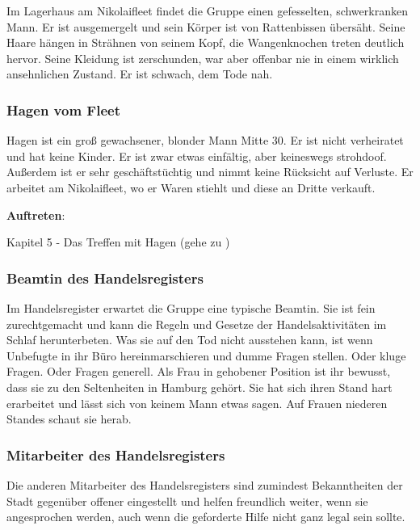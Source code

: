 Im Lagerhaus am Nikolaifleet findet die Gruppe einen gefesselten, schwerkranken Mann. Er ist ausgemergelt und sein Körper ist von Rattenbissen übersäht. Seine Haare hängen in Strähnen von seinem Kopf, die Wangenknochen treten deutlich hervor. Seine Kleidung ist zerschunden, war aber offenbar nie in einem wirklich ansehnlichen Zustand. Er ist schwach, dem Tode nah.

\subsubsection*{Hagen vom Fleet}
\label{Hagen}

Hagen ist ein groß gewachsener, blonder Mann Mitte 30. Er ist nicht verheiratet und hat keine Kinder. Er ist zwar etwas einfältig, aber keineswegs strohdoof. Außerdem ist er sehr geschäftstüchtig und nimmt keine Rücksicht auf Verluste. Er arbeitet am Nikolaifleet, wo er Waren stiehlt und diese an Dritte verkauft.

\textbf{Auftreten}:

Kapitel 5 - Das Treffen mit Hagen (gehe zu \blue{\ref{klopf}})

\subsubsection*{Beamtin des Handelsregisters}
\label{Beamtin}

Im Handelsregister erwartet die Gruppe eine typische Beamtin. Sie ist fein zurechtgemacht und kann die Regeln und Gesetze der Handelsaktivitäten im Schlaf herunterbeten. Was sie auf den Tod nicht ausstehen kann, ist wenn Unbefugte in ihr Büro hereinmarschieren und dumme Fragen stellen. Oder kluge Fragen. Oder Fragen generell. Als Frau in gehobener Position ist ihr bewusst, dass sie zu den Seltenheiten in Hamburg gehört. Sie hat sich ihren Stand hart erarbeitet und lässt sich von keinem Mann etwas sagen. Auf Frauen niederen Standes schaut sie herab.

\subsubsection*{Mitarbeiter des Handelsregisters}
\label{Mitarbeiter}

Die anderen Mitarbeiter des Handelsregisters sind zumindest Bekanntheiten der Stadt gegenüber offener eingestellt und helfen freundlich weiter, wenn sie angesprochen werden, auch wenn die geforderte Hilfe nicht ganz legal sein sollte.

